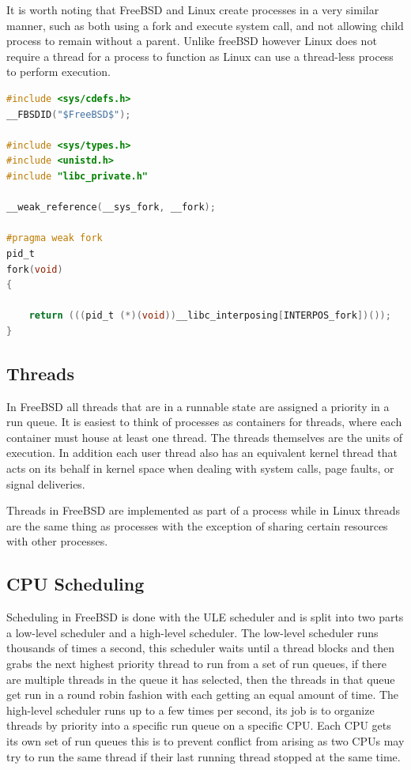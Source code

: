 \documentclass[letterpaper, 10pt, onecolumn, draftclsnofoot]{IEEEtran}
\begin{document}
It is worth noting that FreeBSD and Linux create processes in a very similar manner, such as both using a fork and execute system call, and not allowing child process to remain without a parent. Unlike freeBSD however Linux does not require a thread for a process to function as Linux can use a thread-less process to perform execution.\cite{linux,BSD}

\begin{lstlisting}[language=C]
#include <sys/cdefs.h>
__FBSDID("$FreeBSD$");

#include <sys/types.h>
#include <unistd.h>
#include "libc_private.h"

__weak_reference(__sys_fork, __fork);

#pragma weak fork
pid_t
fork(void)
{

	return (((pid_t (*)(void))__libc_interposing[INTERPOS_fork])());
}
\end{lstlisting}

\subsection{Threads}

In FreeBSD all threads that are in a runnable state are assigned a priority in a run queue. It is easiest to think of processes as containers for threads, where each container must house at least one thread. The threads themselves are the units of execution. In addition each user thread also has an equivalent kernel thread that acts on its behalf in kernel space when dealing with system calls, page faults, or signal deliveries.\cite{BSD}

Threads in FreeBSD are implemented as part of a process while in Linux threads are the same thing as processes with the exception of sharing certain resources with other processes.\cite{linux, BSD}

\subsection{CPU Scheduling}

Scheduling in FreeBSD is done with the ULE scheduler and is split into two parts a low-level scheduler and a high-level scheduler. The low-level scheduler runs thousands of times a second, this scheduler waits until a thread blocks and then grabs the next highest priority thread to run from a set of run queues, if there are multiple threads in the queue it has selected, then the threads in that queue get run in a round robin fashion with each getting an equal amount of time. The high-level scheduler runs up to a few times per second, its job is to organize threads by priority into a specific run queue on a specific CPU. Each CPU gets its own set of run queues this is to prevent conflict from arising as two CPUs may try to run the same thread if their last running thread stopped at the same time.\cite{BSD}
\end{document}
